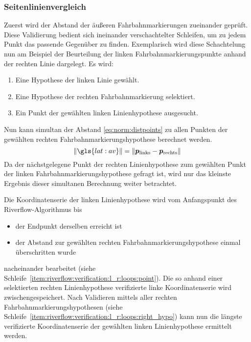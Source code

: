 \subsubsection{Seitenlinienvergleich} 
\label{sssec:fahrspurerkennung:riverflow:verifikation:seitenlinienvergleich}
Zuerst wird der Abstand der äußeren Fahrbahnmarkierungen zueinander geprüft. Diese Validierung bedient sich ineinander verschachtelter Schleifen, um zu jedem Punkt das passende Gegenüber zu finden. Exemplarisch wird diese Schachtelung nun am Beispiel der Beurteilung der linken Fahrbahnmarkierungspunkte anhand der rechten Linie dargelegt. Es wird:
\begin{enumerate}
\item 
Eine Hypothese der linken Linie gewählt.
\item \label{item:riverflow:verification:l_r:loops:right_hypo}
Eine Hypothese der rechten Fahrbahnmarkierung selektiert.
\item \label{item:riverflow:verification:l_r:loops:point}
Ein Punkt der gewählten linken Linienhypothese ausgesucht.
\end{enumerate}
Nun kann simultan der Abstand  \eqref{eq:norm:distpoints} 
zu allen Punkten der gewählten rechten Fahrbahnmarkierungshypothese berechnet werden. 
\begin{equation}
\label{eq:norm:distpoints} 
\nrm{\gls{lat:av}} = \nrm{\pnt{p_{\text{links}}} - \pnt{p_{\text{rechts}}}} 
\end{equation}
Da der nächstgelegene Punkt der rechten Linienhypothese zum gewählten Punkt der linken Fahrbahnmarkierungshypothese gefragt ist, wird nur das kleinste Ergebnis dieser simultanen Berechnung weiter betrachtet.

Die Koordinatenserie der linken Linienhypothese wird vom Anfangspunkt des Riverflow-Algorithmus bis
\begin{itemize}
\item der Endpunkt derselben erreicht ist 
\item der Abstand zur gewählten rechten Fahrbahnmarkierungshypothese einmal überschritten wurde
\end{itemize}
nacheinander bearbeitet (siehe Schleife~\ref{item:riverflow:verification:l_r:loops:point}). Die so anhand einer selektierten rechten Linienhypothese verifizierte linke Koordinatenserie wird zwischengespeichert. 
Nach Validieren mittels aller rechten Fahrbahnmarkierungshypothesen (siehe Schleife~\ref{item:riverflow:verification:l_r:loops:right_hypo}) kann nun die längste verifizierte Koordinatenserie der gewählten linken Linienhypothese ermittelt werden.

